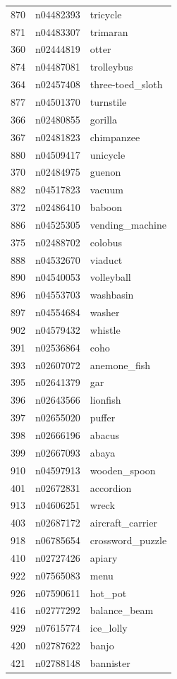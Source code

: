 \begin{table}
\begin{tabular}{cll}
870 & n04482393 & tricycle \\
871 & n04483307 & trimaran \\
360 & n02444819 & otter \\
874 & n04487081 & trolleybus \\
364 & n02457408 & three-toed_sloth \\
877 & n04501370 & turnstile \\
366 & n02480855 & gorilla \\
367 & n02481823 & chimpanzee \\
880 & n04509417 & unicycle \\
370 & n02484975 & guenon \\
882 & n04517823 & vacuum \\
372 & n02486410 & baboon \\
886 & n04525305 & vending_machine \\
375 & n02488702 & colobus \\
888 & n04532670 & viaduct \\
890 & n04540053 & volleyball \\
896 & n04553703 & washbasin \\
897 & n04554684 & washer \\
902 & n04579432 & whistle \\
391 & n02536864 & coho \\
393 & n02607072 & anemone_fish \\
395 & n02641379 & gar \\
396 & n02643566 & lionfish \\
397 & n02655020 & puffer \\
398 & n02666196 & abacus \\
399 & n02667093 & abaya \\
910 & n04597913 & wooden_spoon \\
401 & n02672831 & accordion \\
913 & n04606251 & wreck \\
403 & n02687172 & aircraft_carrier \\
918 & n06785654 & crossword_puzzle \\
410 & n02727426 & apiary \\
922 & n07565083 & menu \\
926 & n07590611 & hot_pot \\
416 & n02777292 & balance_beam \\
929 & n07615774 & ice_lolly \\
420 & n02787622 & banjo \\
421 & n02788148 & bannister \\

\end{tabular}
\end{table}
